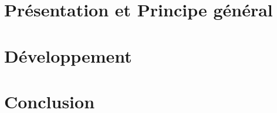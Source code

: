 \documentclass[a4paper]{article}
\begin{document}
\section{Présentation et Principe général}







\section{Développement}








\section{Conclusion}
\end{document}
